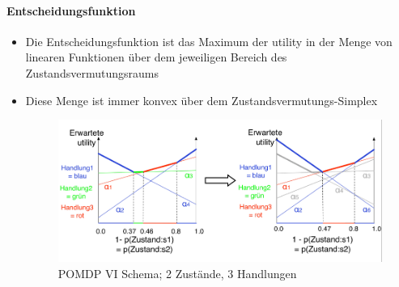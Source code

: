 \paragraph{Entscheidungsfunktion}
\begin{itemize}
	\item Die Entscheidungsfunktion ist das Maximum der utility in der Menge von linearen Funktionen \"uber dem jeweiligen Bereich des Zustandsvermutungsraums
	\item Diese Menge ist immer konvex \"uber dem Zustandsvermutungs-Simplex
	\begin{figure}[!h]
			\centering
  			\includegraphics[width=0.7\linewidth]{figures/ch08_vi-bsp2.png}
  			\centering
			\caption{POMDP VI Schema; 2 Zustände, 3 Handlungen}
			\label{ch08:vi3}
	\end{figure}
\end{itemize}

